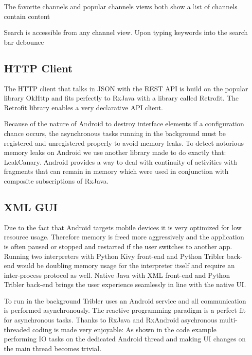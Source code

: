 The favorite channels and popular channels views both show a list of channels  contain content

Search is accessible from any channel view.
Upon typing keywords into the search bar
debounce



\subsection{HTTP Client}
The HTTP client that talks in JSON with the REST API is build on the popular library OkHttp and fits perfectly to RxJava with a library called Retrofit.
The Retrofit library enables a very declarative API client.

Because of the nature of Android to destroy interface elements if a configuration chance occurs, the asynchronous tasks running in the background must be registered and unregistered properly to avoid memory leaks.
To detect notorious memory leaks on Android we use another library made to do exactly that: LeakCanary.
Android provides a way to deal with continuity of activities with fragments that can remain in memory which were used in conjunction with composite subscriptions of RxJava.

\subsection{XML GUI} %
Due to the fact that Android targets mobile devices it is very optimized for low resource usage.
Therefore memory is freed more aggressively and the application is often paused or stopped and restarted if the user switches to another app.
Running two interpreters with Python Kivy front-end and Python Tribler back-end would be doubling memory usage for the interpreter itself and require an inter-process protocol as well.
Native Java with XML front-end and Python Tribler back-end brings the user experience seamlessly in line with the native UI.

To run in the background Tribler uses an Android service and all communication is performed asynchronously.
The reactive programming paradigm is a perfect fit for asynchronous tasks.
Thanks to RxJava and RxAndroid asychronous multi-threaded coding is made very enjoyable:
As shown in the code example performing IO tasks on the dedicated Android thread and making UI changes on the main thread becomes trivial.


